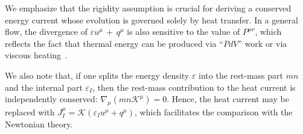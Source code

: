 \documentclass[a4paper, amsfonts, amssymb, amsmath, reprint, showkeys, nofootinbib, twoside, onecolumn,notitlepage]{revtex4-1}
\newcommand{\K}{{\mathcal{K}}}
\theoremstyle{definition}
\theoremstyle{theorem}
\begin{document}
We emphasize that the rigidity assumption is crucial for deriving a conserved energy current whose evolution is governed solely by heat transfer. In a general flow, the divergence of $\varepsilon u^\mu \,{+}\,q^\mu$ is also sensitive to the value of $P^{\mu \nu}$, which reflects the fact that thermal energy can be produced via ``$PdV$'' work or via viscous heating~\cite[\S 50]{landau6}. 

We also note that, if one splits the energy density $\varepsilon$ into the rest-mass part $mn$ and the internal part $\varepsilon_I$, then the rest-mass contribution to the heat current is independently conserved: $\nabla_\mu (mn\K^\mu)=0$. Hence, the heat current may be replaced with $J_{I}^\mu=\K(\varepsilon_I u^\mu +q^\mu)$, which facilitates the comparison with the Newtonian theory.


\end{document}

